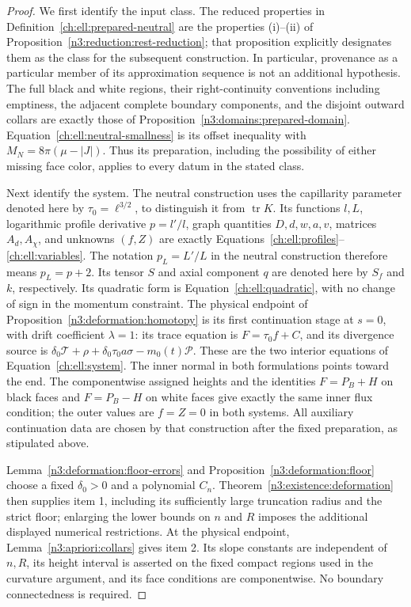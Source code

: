 \begin{proof}
We first identify the input class. The reduced properties in
Definition~\ref{ch:ell:prepared-neutral} are the properties
\textup{(i)--(ii)} of Proposition~\ref{n3:reduction:rest-reduction};
that proposition explicitly designates them as the class for the
subsequent construction. In particular, provenance as a particular
member of its approximation sequence is not an additional hypothesis.
The full black and white regions, their right-continuity conventions
including emptiness, the adjacent complete boundary components, and the
disjoint outward collars are exactly those of
Proposition~\ref{n3:domains:prepared-domain}. Equation~\eqref{ch:ell:neutral-smallness}
is its offset inequality with $M_N=8\pi(\mu-|J|)$.
Thus its preparation, including the possibility of either missing face
color, applies to every datum in the stated class.

Next identify the system. The neutral construction uses the capillarity
parameter denoted here by $\tau_0=\ell^{3/2}$, to distinguish it from
$\operatorname{tr}K$. Its functions $l,L$, logarithmic profile derivative
$p=l'/l$, graph quantities $D,d,w,a,v$, matrices $A_d,A_\chi$, and
unknowns $(f,Z)$ are exactly Equations~\eqref{ch:ell:profiles}--\eqref{ch:ell:variables}.
The notation $p_L=L'/L$ in the neutral construction therefore means
$p_L=p+2$. Its tensor $S$ and axial component $q$ are denoted here by
$S_f$ and $k$, respectively. Its quadratic form is
Equation~\eqref{ch:ell:quadratic},
with no change of sign in the momentum constraint. The physical endpoint
of Proposition~\ref{n3:deformation:homotopy} is its first continuation stage
at $s=0$, with drift coefficient $\lambda=1$: its trace equation is
$F=\tau_0f+C$, and
its divergence source is
$\delta_0\mathcal T+\rho+\delta_0\tau_0a\sigma-m_0(t)\mathcal P$.
These are the two interior equations of Equation~\eqref{ch:ell:system}.
The inner normal in both formulations points toward the end. The
componentwise assigned heights and the identities
$F=P_B+H$ on black faces and $F=P_B-H$ on white faces give exactly the
same inner flux condition; the outer values are $f=Z=0$ in both systems.
All auxiliary continuation data are chosen by that construction after
the fixed preparation, as stipulated above.

Lemma~\ref{n3:deformation:floor-errors} and
Proposition~\ref{n3:deformation:floor} choose a fixed $\delta_0>0$ and a
polynomial $C_n$. Theorem~\ref{n3:existence:deformation} then supplies item
\textup{1}, including its sufficiently large truncation radius and the
strict floor; enlarging the lower bounds on $n$ and $R$ imposes the
additional displayed numerical restrictions. At the physical endpoint,
Lemma~\ref{n3:apriori:collars} gives item \textup{2}. Its slope constants
are independent of $n,R$, its height interval is asserted on the fixed
compact regions used in the curvature argument, and its face conditions
are componentwise. No boundary connectedness is required.


\end{proof}
